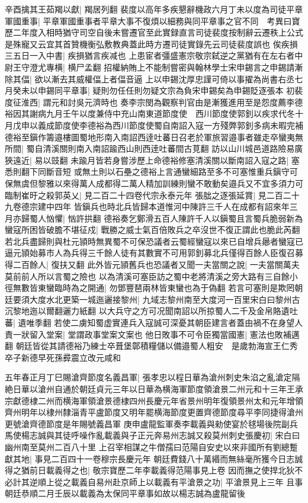 辛酉擒其王茹羯以獻|{
	羯居列翻}
裴度以高年多疾懇辭機政六月丁未以度為司徒平章軍國重事|{
	平章軍國重事者平章大事不復煩以細務與同平章事之官不同　考異曰寶歷二年度入相時猶守司空自後未嘗遷官至此實録直言司徒裴度按制辭云遷秩上公式是殊寵又云宜其首贊機衡弘敷教典蓋此時方遷司徒實錄先云司徒裴度誤也}
俟疾損三五日一入中書|{
	疾損猶言疾减也}
上患宦者彊盛憲宗敬宗弑逆之黨猶有在左右者中尉王守澄尤專横|{
	横尸孟翻}
招權納賄上不能制嘗密與翰林學士宋申錫言之申錫請漸除其偪|{
	欲以漸去其威權偪上者偪音逼}
上以申錫沈厚忠謹可倚以事擢為尚書右丞七月癸未以申錫同平章事|{
	疑則勿任任則勿疑文宗為負宋申錫矣為申錫貶逐張本}
初裴度征淮西|{
	謂元和討吳元濟時也}
奏李宗閔為觀察判官由是漸獲進用至是怨度薦李德裕因其謝病九月壬午以度兼侍中充山南東道節度使　西川節度使郭釗以疾求代冬十月戊申以義成節度使李德裕為西川節度使蜀自南詔入寇一方殘弊郭釗多病未暇完補德裕至鎭作籌邉樓圖蜀地形南入南詔西逹吐蕃日召老於軍旅習邉事者雖走卒蠻夷無所間|{
	蜀自清溪關則南入南詔踰西山則西逹吐蕃間古莧翻}
訪以山川城邑道路險易廣狹遠近|{
	易以豉翻}
未踰月皆若身嘗涉歷上命德裕修塞清溪關以斷南詔入寇之路|{
	塞悉則翻下同斷音短}
或無土則以石壘之德裕上言通蠻細路至多不可塞惟重兵鎭守可保無虞但黎雅以來得萬人成都得二萬人精加訓練則蠻不敢動矣邉兵又不宜多須力可臨制崔旴之殺郭英乂|{
	見二百二十四卷代宗永泰元年}
張朏之逐張延賞|{
	見二百二十九卷德宗建中四年}
皆鎭兵也時北兵皆歸本道惟河中陳許三千人在成都有詔來年三月亦歸蜀人忷懼|{
	忷許拱翻}
德裕奏乞鄭滑五百人陳許千人以鎭蜀且言蜀兵脆弱新為蠻寇所困皆破膽不堪征戍|{
	戰勝之威士氣百倍敗兵之卒沒世不復正謂此也脆此芮翻}
若北兵盡歸則與杜元頴時無異蜀不可保恐議者云蜀經蠻寇以來已自增兵曏者蠻寇已逼元頴始募市人為兵得三千餘人徒有其數實不可用郭釗募北兵僅得百餘人臣復召募得二百餘人|{
	復扶又翻}
此外皆元頴舊兵也恐議者又聞一夫當關之說|{
	一夫當關萬夫莫前前人所以言蜀之險也}
以為清溪可塞臣訪之蜀中老將清溪之旁大路有三自餘小徑無數皆東蠻臨時為之開通|{
	勿鄧豐琶兩林皆東蠻也為于偽翻}
若言可塞則是欺罔朝廷要須大度水北更築一城迤邐接黎州|{
	九域志黎州南至大度河一百里宋白曰黎州古沉黎地迤以爾翻邐力紙翻}
以大兵守之方可况聞南詔以所掠蜀人二千及金帛賂遺吐蕃|{
	遺唯季翻}
若使二虜知蜀虚實連兵入寇誠可深憂其朝臣建言者蓋由禍不在身望人責一狀留入堂案|{
	堂謂政事堂案文案也}
他日敗事不可令臣獨當國憲|{
	憲法也敗補邁翻}
朝廷皆從其請德裕乃練士卒葺堡鄣積糧儲以備邉蜀人粗安　是歲勃海宣王仁秀卒子新德早死孫彛震立改元咸和

五年春正月丁巳賜滄齊節度名義昌軍|{
	張孝忠以程日華為滄州刺史朱淊之亂滄定隔絶日華以滄州自通於朝廷貞元三年以日華為横海軍節度領滄景二州元和十三年王承宗獻德棣二州而横海軍領滄景德棣四州長慶元年省景州明年復領景州太和元年增領齊州明年以棣州隸淄青平盧節度又明年罷横海節度更置齊德節度尋平李同捷得滄州更號滄齊德節度是年賜號義昌軍}
庚申盧龍監軍奏李載義與勑使宴於毬場後院副兵馬使楊志誠與其徒呼噪作亂載義與子正元奔易州志誠又殺莫州刺史張慶初|{
	宋白曰幽州南至莫州二百八十里}
上召宰相謀之牛僧孺曰范陽自安史以來非國所有劉總蹔獻其地|{
	事見二百四十一卷穆宗長慶元年}
朝廷費錢八十萬緡而無絲毫所獲今日志誠得之猶前日載義得之也|{
	敬宗寶歷二年李載義得范陽事見上卷}
因而撫之使捍北狄不必計其逆順上從之載義自易州赴京師上以載義有平滄景之功|{
	平滄景見上三年}
且事朝廷恭順二月壬辰以載義為太保同平章事如故以楊志誠為盧龍留後


